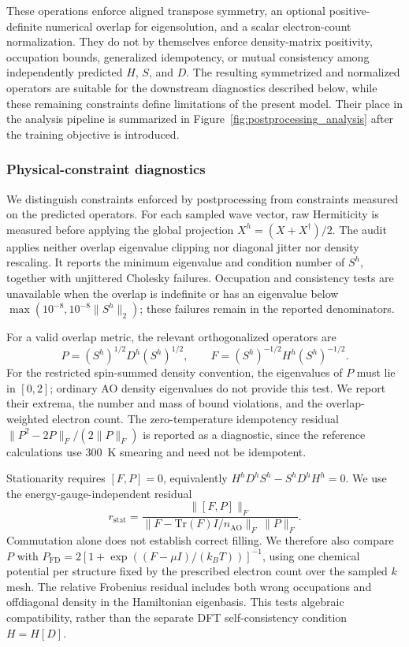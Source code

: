 \documentclass[preprint,12pt,compress,numafflabel]{elsarticle}
\newcommand{\Tr}{\mathrm{Tr}}
\begin{document}
These operations enforce aligned transpose symmetry, an optional positive-definite numerical overlap for eigensolution, and a scalar electron-count normalization. They do not by themselves enforce density-matrix positivity, occupation bounds, generalized idempotency, or mutual consistency among independently predicted $H$, $S$, and $D$. The resulting symmetrized and normalized operators are suitable for the downstream diagnostics described below, while these remaining constraints define limitations of the present model.
Their place in the analysis pipeline is summarized in Figure~\ref{fig:postprocessing_analysis} after the training objective is introduced.

\subsubsection{Physical-constraint diagnostics}
\label{subsubsec:physical-constraints}

We distinguish constraints enforced by postprocessing from constraints measured on the predicted operators. For each sampled wave vector, raw Hermiticity is measured before applying the global projection $X^h=(X+X^\dagger)/2$. The audit applies neither overlap eigenvalue clipping nor diagonal jitter nor density rescaling. It reports the minimum eigenvalue and condition number of $S^h$, together with unjittered Cholesky failures. Occupation and consistency tests are unavailable when the overlap is indefinite or has an eigenvalue below $\max(10^{-8},10^{-8}\|S^h\|_2)$; these failures remain in the reported denominators.

For a valid overlap metric, the relevant orthogonalized operators are
\begin{equation}
P=(S^h)^{1/2}D^h(S^h)^{1/2},
\qquad
F=(S^h)^{-1/2}H^h(S^h)^{-1/2}.
\end{equation}
For the restricted spin-summed density convention, the eigenvalues of $P$ must lie in $[0,2]$; ordinary AO density eigenvalues do not provide this test. We report their extrema, the number and mass of bound violations, and the overlap-weighted electron count. The zero-temperature idempotency residual $\|P^2-2P\|_F/(2\|P\|_F)$ is reported as a diagnostic, since the reference calculations use 300~K smearing and need not be idempotent.

Stationarity requires $[F,P]=0$, equivalently $H^hD^hS^h-S^hD^hH^h=0$. We use the energy-gauge-independent residual
\begin{equation}
r_{\mathrm{stat}}=
\frac{\|[F,P]\|_F}
{\|F-\Tr(F)I/n_{\mathrm{AO}}\|_F\,\|P\|_F}.
\end{equation}
Commutation alone does not establish correct filling. We therefore also compare $P$ with $P_{\mathrm{FD}}=2[1+\exp((F-\mu I)/(k_B T))]^{-1}$, using one chemical potential per structure fixed by the prescribed electron count over the sampled $k$ mesh. The relative Frobenius residual includes both wrong occupations and offdiagonal density in the Hamiltonian eigenbasis. This tests algebraic compatibility, rather than the separate DFT self-consistency condition $H=H[D]$.
\end{document}
